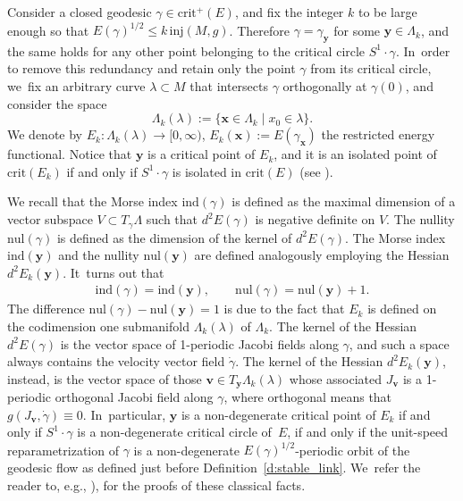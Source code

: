 \documentclass[JEP,XML,SOM,Unicode,NoFloatCountersInSection,published]{cedram}
\let\sep\mid
\let\bm\boldsymbol
\newcommand{\xx}{\bm{x}}
\newcommand{\yy}{\bm{y}}
\newcommand{\vv}{\bm{v}}
\newcommand{\crit}{\mathrm{crit}}
\newcommand{\ind}{\mathrm{ind}}
\newcommand{\inj}{\mathrm{inj}}
\newcommand{\nul}{\mathrm{nul}}
\theoremstyle{plain}
\theoremstyle{definition}
\begin{document}
Consider a closed geodesic $\gamma\in\crit^+(E)$, and fix the integer $k$ to be large enough so that $E(\gamma)^{1/2}\leq k\,\inj(M,g)$. Therefore $\gamma=\gamma_{\yy}$ for some $\yy\in\Lambda_k$, and the same holds for any other point belonging to the critical circle $S^1\cdot\gamma$. In~order to remove this redundancy and retain only the point $\gamma$ from its critical circle, we~fix an arbitrary curve $\lambda\subset M$ that intersects $\gamma$ orthogonally at $\gamma(0)$, and consider the space
\[
\Lambda_k(\lambda) :=\big\{ \xx\in\Lambda_k\sep x_0\in\lambda\big\}.
\]
We denote by $E_k:\Lambda_k(\lambda)\to[0,\infty)$, $E_k(\xx):=E(\gamma_{\xx})$ the restricted energy functional.
Notice that $\yy$ is a critical point of $E_k$, and it is an isolated point of $\crit(E_k)$ if and only if $S^1\cdot\gamma$ is isolated in $\crit(E)$ (see \cite[Prop.\,3.1]{Asselle:2018aa}).

We recall that the Morse index $\ind(\gamma)$ is defined as the maximal dimension of a vector subspace $V\subset T_\gamma \Lambda$ such that $d^2E(\gamma)$ is negative definite on $V$. The nullity $\nul(\gamma)$ is defined as the dimension of the kernel of $d^2E(\gamma)$.
The Morse index $\ind(\yy)$ and the nullity $\nul(\yy)$ are defined analogously employing the Hessian $d^2E_k(\yy)$. It~turns out that
\begin{align*}
\ind(\gamma)=\ind(\yy),\qquad
\nul(\gamma)=\nul(\yy)+1.
\end{align*}
The difference $\nul(\gamma)-\nul(\yy)=1$ is due to the fact that $E_k$ is defined on the codimension one submanifold $\Lambda_k(\lambda)$ of $\Lambda_k$.
The kernel of the Hessian $d^2E(\gamma)$ is the vector space of 1-periodic Jacobi fields along $\gamma$, and such a space always contains the velocity vector field $\dot\gamma$. The kernel of the Hessian $d^2E_k(\yy)$, instead, is the vector space of those $\bm v\in T_{\yy}\Lambda_k(\lambda)$ whose associated $J_{\vv}$ is a 1-periodic orthogonal Jacobi field along $\gamma$, where orthogonal means that $g(J_{\vv},\dot\gamma)\equiv0$. In~particular, $\yy$ is a non-degenerate critical point of $E_k$ if and only if $S^1\cdot\gamma$ is a non-degenerate critical circle of~$E$, if and only if the unit-speed reparametrization of $\gamma$ is a non-degenerate $E(\gamma)^{1/2}$-periodic orbit of the geodesic flow as defined just before Definition~\ref{d:stable_link}. We~refer the reader to, e.g., \cite[\S 4]{Mazzucchelli:2016aa}), for the proofs of these classical facts.
\end{document}
